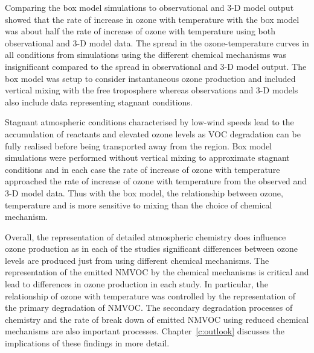 Comparing the box model simulations to observational and 3-D model output showed that the rate of increase in ozone with temperature with the box model was about half the rate of increase of ozone with temperature using both observational and 3-D model data.
The spread in the ozone-temperature curves in all  conditions from simulations using the different chemical mechanisms was insignificant compared to the spread in observational and 3-D model output.
The box model was setup to consider instantaneous ozone production and included vertical mixing with the free troposphere whereas observations and 3-D models also include data representing stagnant conditions.

Stagnant atmospheric conditions characterised by low-wind speeds lead to the accumulation of reactants and elevated ozone levels as VOC degradation can be fully realised before being transported away from the region.
Box model simulations were performed without vertical mixing to approximate stagnant conditions and in each case the rate of increase of ozone with temperature approached the rate of increase of ozone with temperature from the observed and 3-D model data.
Thus with the box model, the relationship between ozone, temperature and  is more sensitive to mixing than the choice of chemical mechanism.

Overall, the representation of detailed atmospheric chemistry does influence ozone production as in each of the studies significant differences between ozone levels are produced just from using different chemical mechanisms.
The representation of the emitted NMVOC by the chemical mechanisms is critical and lead to differences in ozone production in each study.
In particular, the relationship of ozone with temperature was controlled by the representation of the primary degradation of NMVOC.
The secondary degradation processes of  chemistry and the rate of break down of emitted NMVOC using reduced chemical mechanisms are also important processes.
Chapter~\ref{c:outlook} discusses the implications of these findings in more detail.
